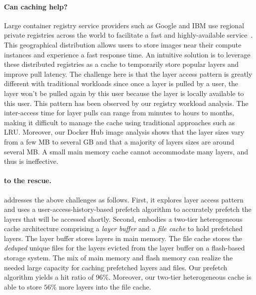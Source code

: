 \paragraph{Can caching help?}
Large container registry service providers such as Google and IBM use regional private registries across the world to facilitate a fast and highly-available service~\cite{ibmregistry,GoogleContainerRegistry}.  
This geographical distribution allows users to store images near their compute instances and experience a fast response time. 
An intuitive solution is to 
leverage these distributed registries as a cache to temporarily store popular layers and
improve pull latency.
The challenge here is that the layer access pattern is greatly different with traditional workloads 
since once a layer is pulled by a user, the layer won't be pulled again by this user because
the layer is locally available to this user. 
This pattern has been observed by our registry workload analysis. 
The inter-access time for layer pulls can range from minutes to hours to months, making it difficult to manage the cache using traditional approaches such as LRU.
Moreover, our Docker Hub image analysis shows that the layer sizes 
vary from a few MB to several GB and that a majority of layers sizes are around several MB. A small main memory cache cannot accommodate many layers, and thus is ineffective. 

\paragraph{\sysname to the rescue.}
\sysname addresses the above challenges as follows. 
First, it explores layer access pattern and uses a 
user-access-history-based prefetch algorithm to accurately prefetch
the layers that will be accessed shortly.
%
Second, \sysname embodies a two-tier heterogeneous cache architecture 
comprising a {\em layer buffer} and a {\em file cache} to hold  prefetched layers.
The layer buffer stores layers in main memory. The file cache stores 
the \emph{deduped} unique files for the layers evicted from the layer buffer on a 
flash-based storage system.
The mix of main memory and flash memory can realize the needed large capacity for caching prefetched layers and files. 
Our prefetch algorithm yields a hit ratio of $96$\%. 
Moreover, our two-tier heterogeneous cache is able to store $56$\% more layers into the file cache.

